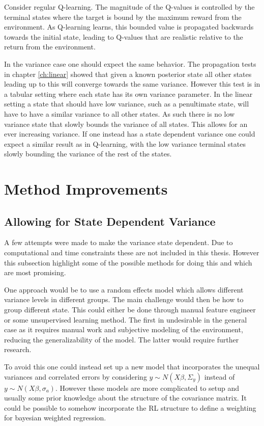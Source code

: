 Consider regular Q-learning. The magnitude of the Q-values is controlled by the terminal states where the target is bound by the maximum reward from the environment. As Q-learning learns, this bounded value is propagated backwards towards the initial state, leading to Q-values that are realistic relative to the return from the environment.

In the variance case one should expect the same behavior. The propagation tests in chapter \ref{ch:linear} showed that given a known posterior state all other states leading up to this will converge towards the same variance. However this test is in a tabular setting where each state has its own variance parameter. In the linear setting a state that should have low variance, such as a penultimate state, will have to have a similar variance to all other states. As such there is no low variance state that slowly bounds the variance of all states. This allows for an ever increasing variance. If one instead has a state dependent variance one could expect a similar result as in Q-learning, with the low variance terminal states slowly bounding the variance of the rest of the states.

\section{Method Improvements}

\subsection{Allowing for State Dependent Variance}

A few attempts were made to make the variance state dependent. Due to computational and time constraints these are not included in this thesis. However this subsection highlight some of the possible methods for doing this and which are most promising.

One approach would be to use a random effects model\citep[p.~382-383]{gelman_2013} which allows different variance levels in different groups. The main challenge would then be how to group different state. This could either be done through manual feature engineer or some unsupervised learning method. The first in undesirable in the general case as it requires manual work and subjective modeling of the environment, reducing the generalizability of the model. The latter would require further research.

To avoid this one could instead set up a new model that incorporates the unequal variances and correlated errors by considering $y \sim N(X\beta, \Sigma_y)$ instead of $y \sim N(X\beta, \sigma_a)$.  However these models are more complicated to setup and usually some prior knowledge about the structure of the covariance matrix. It could be possible to somehow incorporate the RL structure to define a weighting for bayesian weighted regression\citep[p.~370-373]{gelman_2013}. 

